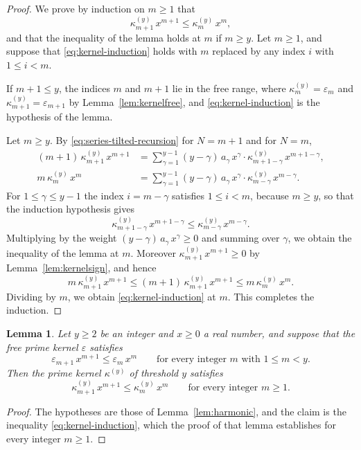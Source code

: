 \documentclass{amsart}
\newtheorem{lemma}[theorem]{Lemma}
\theoremstyle{definition}
\theoremstyle{remark}
\numberwithin{equation}{section}
\begin{document}
\begin{proof}
We prove by induction on $m\ge1$ that
\begin{equation}\label{eq:kernel-induction}
\kappa^{(y)}_{m+1}\,x^{m+1}\le\kappa^{(y)}_m\,x^m ,
\end{equation}
and that the inequality of the lemma holds at $m$ if $m\ge y$. Let $m\ge1$,
and suppose that \eqref{eq:kernel-induction} holds with $m$ replaced by any
index $i$ with $1\le i<m$.

If $m+1\le y$, the indices $m$ and $m+1$ lie in the free range, where
$\kappa^{(y)}_m=\varepsilon_m$ and $\kappa^{(y)}_{m+1}=\varepsilon_{m+1}$ by
Lemma~\ref{lem:kernelfree}, and \eqref{eq:kernel-induction} is the
hypothesis of the lemma.

Let $m\ge y$. By \eqref{eq:series-tilted-recursion} for $N=m+1$ and for
$N=m$,
\begin{align*}
(m+1)\,\kappa^{(y)}_{m+1}\,x^{m+1}
&=\sum_{\gamma=1}^{y-1}(y-\gamma)\,a_\gamma\,x^{\gamma}
\cdot\kappa^{(y)}_{m+1-\gamma}\,x^{m+1-\gamma},\\
m\,\kappa^{(y)}_m\,x^m
&=\sum_{\gamma=1}^{y-1}(y-\gamma)\,a_\gamma\,x^{\gamma}
\cdot\kappa^{(y)}_{m-\gamma}\,x^{m-\gamma} .
\end{align*}
For $1\le\gamma\le y-1$ the index $i=m-\gamma$ satisfies $1\le i<m$,
because $m\ge y$, so that the induction hypothesis gives
\[
\kappa^{(y)}_{m+1-\gamma}\,x^{m+1-\gamma}
\le\kappa^{(y)}_{m-\gamma}\,x^{m-\gamma} .
\]
Multiplying by the weight $(y-\gamma)\,a_\gamma\,x^{\gamma}\ge0$ and
summing over $\gamma$, we obtain the inequality of the lemma at $m$.
Moreover $\kappa^{(y)}_{m+1}\,x^{m+1}\ge0$ by Lemma~\ref{lem:kernelsign},
and hence
\[
m\,\kappa^{(y)}_{m+1}\,x^{m+1}\le(m+1)\,\kappa^{(y)}_{m+1}\,x^{m+1}
\le m\,\kappa^{(y)}_m\,x^m .
\]
Dividing by $m$, we obtain \eqref{eq:kernel-induction} at $m$. This
completes the induction.
\end{proof}

\begin{lemma}\label{lem:kerneldecrease}
Let $y\ge2$ be an integer and $x\ge0$ a real number, and suppose that the
free prime kernel $\varepsilon$ satisfies
\[
\varepsilon_{m+1}\,x^{m+1}\le\varepsilon_m\,x^m
\qquad\text{for every integer $m$ with }1\le m<y .
\]
Then the prime kernel $\kappa^{(y)}$ of threshold $y$ satisfies
\[
\kappa^{(y)}_{m+1}\,x^{m+1}\le\kappa^{(y)}_m\,x^m
\qquad\text{for every integer }m\ge1 .
\]
\end{lemma}

\begin{proof}
The hypotheses are those of Lemma~\ref{lem:harmonic}, and the claim is the
inequality \eqref{eq:kernel-induction}, which the proof of that lemma
establishes for every integer $m\ge1$.
\end{proof}
\end{document}
